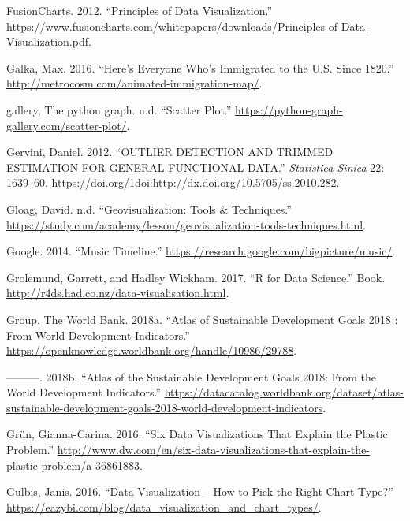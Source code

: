\documentclass[]{book}
\begin{document}
\leavevmode\hypertarget{ref-principles-fusioncharts}{}%
FusionCharts. 2012. ``Principles of Data Visualization.'' \url{https://www.fusioncharts.com/whitepapers/downloads/Principles-of-Data-Visualization.pdf}.

\leavevmode\hypertarget{ref-immigration}{}%
Galka, Max. 2016. ``Here's Everyone Who's Immigrated to the U.S. Since 1820.'' \url{http://metrocosm.com/animated-immigration-map/}.

\leavevmode\hypertarget{ref-The_python_graph_gallery_scatter_plot}{}%
gallery, The python graph. n.d. ``Scatter Plot.'' \url{https://python-graph-gallery.com/scatter-plot/}.

\leavevmode\hypertarget{ref-Gervini}{}%
Gervini, Daniel. 2012. ``OUTLIER DETECTION AND TRIMMED ESTIMATION FOR GENERAL FUNCTIONAL DATA.'' \emph{Statistica Sinica} 22: 1639--60. \url{https://doi.org/1doi:http://dx.doi.org/10.5705/ss.2010.282}.

\leavevmode\hypertarget{ref-Geovisualization}{}%
Gloag, David. n.d. ``Geovisualization: Tools \& Techniques.'' \url{https://study.com/academy/lesson/geovisualization-tools-techniques.html}.

\leavevmode\hypertarget{ref-google_music}{}%
Google. 2014. ``Music Timeline.'' \url{https://research.google.com/bigpicture/music/}.

\leavevmode\hypertarget{ref-Grammar_Graphics}{}%
Grolemund, Garrett, and Hadley Wickham. 2017. ``R for Data Science.'' Book. \url{http://r4ds.had.co.nz/data-visualisation.html}.

\leavevmode\hypertarget{ref-worldbankpub}{}%
Group, The World Bank. 2018a. ``Atlas of Sustainable Development Goals 2018 : From World Development Indicators.'' \url{https://openknowledge.worldbank.org/handle/10986/29788}.

\leavevmode\hypertarget{ref-data_access}{}%
---------. 2018b. ``Atlas of the Sustainable Development Goals 2018: From the World Development Indicators.'' \url{https://datacatalog.worldbank.org/dataset/atlas-sustainable-development-goals-2018-world-development-indicators}.

\leavevmode\hypertarget{ref-plastic_pollution_visualizations}{}%
Grün, Gianna-Carina. 2016. ``Six Data Visualizations That Explain the Plastic Problem.'' \url{http://www.dw.com/en/six-data-visualizations-that-explain-the-plastic-problem/a-36861883}.

\leavevmode\hypertarget{ref-DataVisualization_charts}{}%
Gulbis, Janis. 2016. ``Data Visualization -- How to Pick the Right Chart Type?'' \url{https://eazybi.com/blog/data_visualization_and_chart_types/}.
\end{document}
